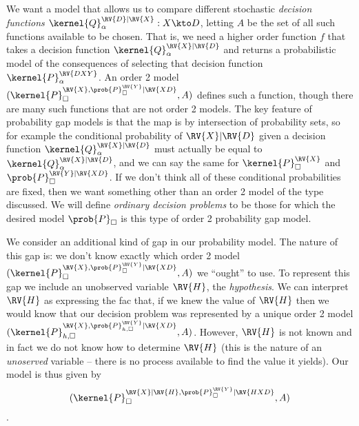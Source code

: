 We want a model that allows us to compare different stochastic \emph{decision functions} $\kernel{Q}^{\RV{D}|\RV{X}}_\alpha:X\kto D$, letting $A$ be the set of all such functions available to be chosen. That is, we need a higher order function $f$ that takes a decision function $\kernel{Q}^{\RV{X}|\RV{D}}_\alpha$ and returns a probabilistic model of the consequences of selecting that decision function $\kernel{P}_\alpha^{\RV{DXY}}$. An order 2 model $(\kernel{P}_\square^{\RV{X},\prob{P}_\square^\RV{Y}|\RV{XD}},A)$ defines such a function, though there are many such functions that are not order 2 models. The key feature of probability gap models is that the map is by intersection of probability sets, so for example the conditional probability of $\RV{X}|\RV{D}$ given a decision function $\kernel{Q}^{\RV{X}|\RV{D}}_\alpha$ must actually be equal to $\kernel{Q}^{\RV{X}|\RV{D}}_\alpha$, and we can say the same for $\kernel{P}_\square^{\RV{X}}$ and $\prob{P}_\square^{\RV{Y}|\RV{XD}}$. If we don't think all of these conditional probabilities are fixed, then we want something other than an order 2 model of the type discussed. We will define \emph{ordinary decision problems} to be those for which the desired model $\prob{P}_\square$ is this type of order 2 probability gap model.


We consider an additional kind of gap in our probability model. The nature of this gap is: we don't know exactly which order 2 model $(\kernel{P}_\square^{\RV{X},\prob{P}_\square^\RV{Y}|\RV{XD}},A)$ we ``ought'' to use. To represent this gap we include an unobserved variable $\RV{H}$, the \emph{hypothesis}. We can interpret $\RV{H}$ as expressing the fac that, if we knew the value of $\RV{H}$ then we would know that our decision problem was represented by a unique order 2 model $(\kernel{P}_{h,\square}^{\RV{X},\prob{P}_{h,\square}^\RV{Y}|\RV{XD}},A)$. However, $\RV{H}$ is not known and in fact we do not know how to determine $\RV{H}$ (this is the nature of an \emph{unoserved} variable -- there is no process available to find the value it yields). Our model is thus given by $$(\kernel{P}_\square^{\RV{X}|\RV{H},\prob{P}_\square^\RV{Y}|\RV{HXD}},A)$$.

